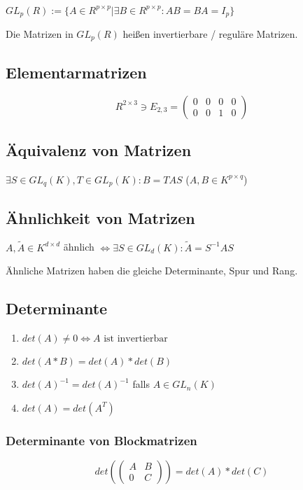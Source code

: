 $GL_p(R) := \{ A \in R^{p \times p} | \exists B \in R^{p \times p} : AB = BA = I_p \}$

Die Matrizen in $GL_p(R)$ heißen invertierbare / reguläre Matrizen.

\subsection*{Elementarmatrizen}

$$R^{2 \times 3} \ni E_{2,3} = \begin{pmatrix}
	0 & 0 & 0 & 0 \\
	0 & 0 & 1 & 0
\end{pmatrix}$$

\subsection*{Äquivalenz von Matrizen}

$\exists S \in GL_q(K), T \in GL_p(K) : B = T A S$ ($A, B \in K^{p \times q}$)

\subsection*{Ähnlichkeit von Matrizen}

$A, \tilde A \in K^{d \times d}$ ähnlich $\Leftrightarrow \exists S \in GL_d(K) : \tilde A = S^{-1}AS$

Ähnliche Matrizen haben die gleiche Determinante, Spur und Rang.

\subsection*{Determinante}

\begin{enumerate}[label=(\alph*)]
	\item $det(A) \neq 0 \Leftrightarrow A \text{ ist invertierbar}$
	\item $det(A*B) = det(A) * det(B)$
	\item $det(A)^{-1} = det(A)^{-1}$ falls $A \in GL_n(K)$
	\item $det(A) = det(A^T)$
\end{enumerate}

\subsubsection*{Determinante von Blockmatrizen}

$$det(\begin{pmatrix}
	A & B \\
	0 & C
\end{pmatrix}) = det(A) * det(C)$$

